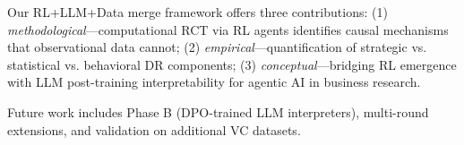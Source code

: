 \documentclass[11pt,a4paper]{article}
\begin{document}
Our RL+LLM+Data merge framework offers three contributions: (1) \emph{methodological}---computational RCT via RL agents identifies causal mechanisms that observational data cannot; (2) \emph{empirical}---quantification of strategic vs. statistical vs. behavioral DR components; (3) \emph{conceptual}---bridging RL emergence with LLM post-training interpretability for agentic AI in business research.

Future work includes Phase B (DPO-trained LLM interpreters), multi-round extensions, and validation on additional VC datasets.



\end{document}
